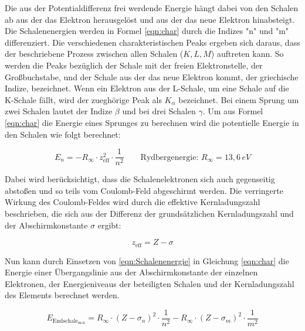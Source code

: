 \documentclass[titlepage = firstcover]{scrartcl}
\begin{document}
                \noindent
                Die aus der Potentialdifferenz frei werdende Energie hängt dabei von den Schalen ab aus der das Elektron herausgelöst und aus der das neue Elektron hinabsteigt. Die Schalenenergien 
                werden in Formel \ref{eqn:char} durch die Indizes "n" und "m" differenziert. Die verschiedenen charakteristischen Peaks ergeben sich daraus, dass der beschriebene Prozess zwischen
                allen Schalen ($K, L, M$) auftreten kann. So werden die Peaks bezüglich der Schale mit der freien Elektronstelle, der Großbuchstabe, und der Schale aus der das neue Elektron kommt,
                der griechische Indize, bezeichnet. Wenn ein Elektron aus der L-Schale, um eine Schale auf die K-Schale fällt, wird der zueghörige Peak als $K_{\alpha}$ bezeichnet. Bei einem Sprung
                um zwei Schalen lautet der Indize $\beta$ und bei drei Schalen $\gamma$. Um aus Formel \ref{eqn:char} die Energie eines Sprunges zu berechnen wird die potentielle Energie in den
                Schalen wie folgt berechnet:

                \begin{equation}
                  E_n = -R_{\infty} \cdot z_{\text{eff}}^2 \cdot \frac{1}{n^2} \qquad \text{Rydbergenergie}: \, R_{\infty}=13,6 \, eV
                  \label{eqn:Schalenenergie}
                \end{equation}
                
                \noindent
                Dabei wird berücksichtigt, dass die Schalenelektronen sich auch gegenseitig abstoßen und so teils vom Coulomb-Feld abgeschirmt werden. Die verringerte Wirkung des Coulomb-Feldes
                wird durch die effektive Kernladungszahl beschrieben, die sich aus der Differenz der grundsätzlichen Kernladungszahl und der Abschirmkonstante $\sigma$ ergibt:
                
                \begin{equation*}
                  z_{\text{eff}} = Z - \sigma
                \end{equation*}
                
                \noindent
                Nun kann durch Einsetzen von \ref{eqn:Schalenenergie} in Gleichung \ref{eqn:char} die Energie einer Übergangslinie aus der Abschirmkonstante der einzelnen Elektronen, der 
                Energieniveaus der beteiligten Schalen und der Kernladungszahl des Elements berechnet werden.
                
                \begin{equation}
                  E_{\text{Endschale}_{\text{m-n}}} = R_{\infty} \cdot (Z - \sigma_n)^2 \cdot \frac{1}{n^2} - R_{\infty} \cdot (Z - \sigma_m)^2 \cdot \frac{1}{m^2}
                  \label{eqn:Energiedifferenz} 
                \end{equation}
                
\end{document}
